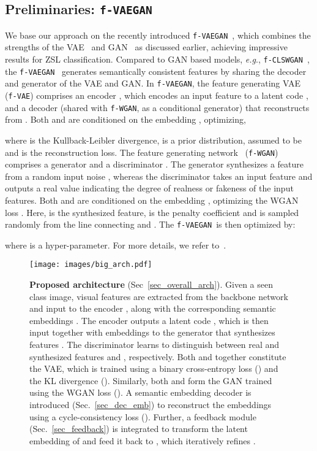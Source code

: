 \documentclass[runningheads]{llncs}
\def\eg{\emph{e.g}.}
\newcommand{\vaegan}{\texttt{f-VAEGAN}}
\begin{document}
\subsection{Preliminaries: \bf\vaegan\label{sec_vaegan}}
We base our approach on the recently introduced \vaegan~\cite{Xian19cvpr}, which combines the strengths of the VAE~\cite{kingma13iclr} and GAN~\cite{GAN} as discussed earlier, achieving impressive results for ZSL classification. Compared to GAN based models, \eg, \texttt{f-CLSWGAN}~\cite{Xian18cvpr}, the \vaegan~\cite{Xian19cvpr} generates semantically consistent features by sharing the decoder and generator of the VAE and GAN.
In \vaegan, the feature generating VAE~\cite{kingma13iclr} (\texttt{f-VAE}) comprises an encoder , which encodes an input feature  to a latent code , and a decoder  (shared with \texttt{f-WGAN}, as a conditional generator) that reconstructs  from . Both  and  are conditioned on the embedding , optimizing, 

where  is the Kullback-Leibler divergence,  is a prior distribution, assumed to be  and  is the reconstruction loss. The feature generating network~\cite{Xian18cvpr} (\texttt{f-WGAN}) comprises a generator  and a discriminator . The generator  synthesizes a feature  from a random input noise , whereas the discriminator  takes an input feature  and outputs a real value indicating the degree of realness or fakeness of the input features. Both  and  are conditioned on the embedding , optimizing the WGAN loss .
Here,  is the synthesized feature,  is the penalty coefficient and  is sampled randomly from the line connecting  and . The \vaegan~is then optimized by:

where  is a hyper-parameter. For more details, we refer to~\cite{Xian19cvpr}. 

\begin{figure}[t]
\centering
\texttt{[image: images/big\_arch.pdf]}\caption{\label{fig_overall_arch}\textbf{Proposed architecture} (Sec~\ref{sec_overall_arch}). Given a seen class image, visual features  are extracted from the backbone network and input to the encoder , along with the corresponding semantic embeddings . The encoder  outputs a latent code , which is then input together with embeddings  to the generator  that synthesizes features . The discriminator  learns to distinguish between real and synthesized features  and , respectively. Both  and  together constitute the VAE, which is trained using a binary cross-entropy loss () and the KL divergence (). Similarly, both  and  form the GAN trained using the WGAN loss ().  A semantic embedding decoder  is introduced (Sec.~\ref{sec_dec_emb}) to reconstruct the embeddings  using a cycle-consistency loss (). Further, a feedback module  (Sec.~\ref{sec_feedback}) is integrated to transform the latent embedding  of  and feed it back to , which iteratively refines .}\end{figure}
\end{document}

